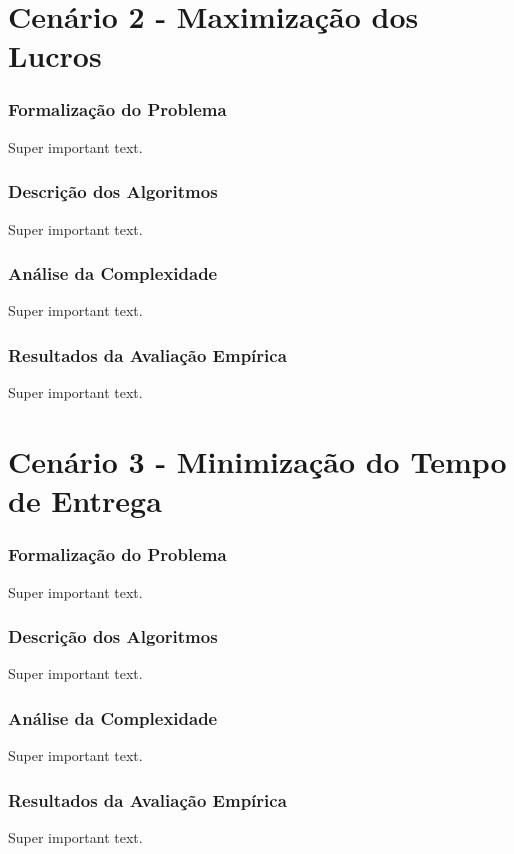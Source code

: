 \documentclass{beamer}
\begin{document}







\section{Cenário 2 - Maximização dos Lucros}

\begin{frame}
  \frametitle{Formalização do Problema}
  Super important text.
\end{frame}

\begin{frame}
  \frametitle{Descrição dos Algoritmos}
  Super important text.
\end{frame}

\begin{frame}
  \frametitle{Análise da Complexidade}
  Super important text.
\end{frame}

\begin{frame}
  \frametitle{Resultados da Avaliação Empírica}
  Super important text.
\end{frame}








\section{Cenário 3 - Minimização do Tempo de Entrega}

\begin{frame}
  \frametitle{Formalização do Problema}
  Super important text.
\end{frame}

\begin{frame}
  \frametitle{Descrição dos Algoritmos}
  Super important text.
\end{frame}

\begin{frame}
  \frametitle{Análise da Complexidade}
  Super important text.
\end{frame}

\begin{frame}
  \frametitle{Resultados da Avaliação Empírica}
  Super important text.
\end{frame}


\end{document}
